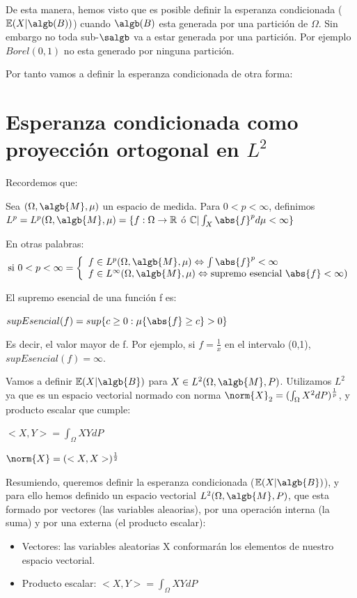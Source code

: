 \documentclass{apuntes}
\begin{document}
De esta manera, hemos visto que es posible definir la esperanza condicionada ($\mathbb{E}(X|\algb(B))$) cuando $\algb(B)$ esta generada por una partición de $\Omega$. Sin embargo no toda sub-$\salgb$ va a estar generada por una partición. Por ejemplo $Borel(0,1)$ no esta generado por ninguna partición.

Por tanto vamos a definir la esperanza condicionada de otra forma:

\section{Esperanza condicionada como proyección ortogonal en $L^2$}
Recordemos que:

Sea $(\Omega, \algb{M}, \mu)$ un espacio de medida. Para $0<p<\infty$, definimos $L^p=L^p(\Omega,\algb{M},\mu)=\{f:\Omega\rightarrow \mathbb{R}$ ó $\mathbb{C} | \int_X \abs{f}^p d\mu < \infty\}$

En otras palabras: 
$$
\text{si } 0<p<\infty =
  \left\lbrace
  \begin{array}{l}
     f\in L^p(\Omega,\algb{M},\mu) \Leftrightarrow \int \abs{f}^p < \infty \\
     f\in L^{\infty}(\Omega,\algb{M},\mu) \Leftrightarrow \text{supremo esencial } \abs{f} < \infty) \\
  \end{array}
  \right.
$$

El supremo esencial de una función f es:

$supEsencial(f)=sup\{c\geq0:\mu\{\abs{f}\geq c\}>0\}$

Es decir, el valor mayor de f. Por ejemplo, si $f=\frac{1}{x}$ en el intervalo (0,1), $supEsencial(f)=\infty$.

Vamos a definir $\mathbb{E}(X|\algb{B})$ para $X\in  L^2(\Omega,\algb{M},P)$. Utilizamos $L^2$ ya que es un espacio vectorial normado con norma $\norm{X}_2 = (\int_\Omega {X^2 dP})^{\frac{1}{p}}$, y producto escalar que cumple:

$<X,Y> = \int_{\Omega}XYdP$

$\norm{X}=(<X,X>)^{\frac{1}{2}}$

Resumiendo, queremos definir la esperanza condicionada ($\mathbb{E}(X|\algb{B})$), y para ello hemos definido un espacio vectorial $L^2(\Omega,\algb{M},P)$, que esta formado por vectores (las variables aleaorias), por una operación interna (la suma) y por una externa (el producto escalar):
\begin{itemize}
\item Vectores: las variables aleatorias X conformarán los elementos de nuestro espacio vectorial.
\item Producto escalar: $<X,Y> = \int_{\Omega}XYdP$
\end{itemize}
\end{document}
